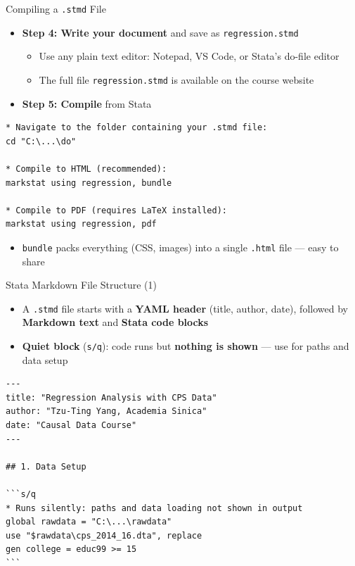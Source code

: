 \documentclass[dvipsnames,hyperref={pdfpagelabels=false}]{beamer}
\begin{document}
\begin{frame}[fragile]{Compiling a \texttt{.stmd} File}

	\begin{itemize}
		\item \textbf{Step 4: Write your document} and save as \texttt{regression.stmd}
		\vspace{0.2cm}
		\begin{itemize}
			\item Use any plain text editor: Notepad, VS Code, or Stata's do-file editor
			\vspace{0.1cm}
			\item The full file \texttt{regression.stmd} is available on the course website
		\end{itemize}
		\vspace{0.3cm}
		\item \textbf{Step 5: Compile} from Stata
	\end{itemize}

\begin{lstlisting}
* Navigate to the folder containing your .stmd file:
cd "C:\...\do"

* Compile to HTML (recommended):
markstat using regression, bundle

* Compile to PDF (requires LaTeX installed):
markstat using regression, pdf
\end{lstlisting}

	\begin{itemize}
		\item \texttt{bundle} packs everything (CSS, images) into a single \texttt{.html} file --- easy to share
	\end{itemize}

\end{frame}



\begin{frame}[fragile]{Stata Markdown File Structure (1)}

	\begin{itemize}
		\item A \texttt{.stmd} file starts with a \textbf{YAML header} (title, author, date), followed by \textbf{Markdown text} and \textbf{Stata code blocks}
		\vspace{0.2cm}
		\item \textbf{Quiet block} (\texttt{{\char96}{}{}s/q}): code runs but \textbf{nothing is shown} --- use for paths and data setup
	\end{itemize}

\begin{lstlisting}[language={},basicstyle=\ttfamily\fontsize{8}{10}\selectfont,keywordstyle={}]
---
title: "Regression Analysis with CPS Data"
author: "Tzu-Ting Yang, Academia Sinica"
date: "Causal Data Course"
---

## 1. Data Setup

```s/q
* Runs silently: paths and data loading not shown in output
global rawdata = "C:\...\rawdata"
use "$rawdata\cps_2014_16.dta", replace
gen college = educ99 >= 15
```
\end{lstlisting}

\end{frame}
\end{document}
